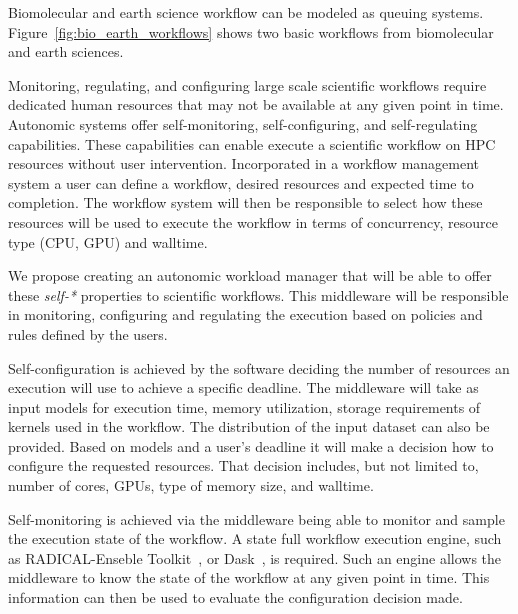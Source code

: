 Biomolecular and earth science workflow can be modeled as queuing systems. Figure~\ref{fig:bio_earth_workflows} shows two basic workflows from biomolecular and earth sciences.




Monitoring, regulating, and configuring large scale scientific workflows 
require dedicated human resources that may not be available at any given point 
in time. Autonomic systems offer self-monitoring, self-configuring, and 
self-regulating capabilities. These capabilities can enable execute a 
scientific workflow on HPC resources without user intervention. Incorporated in 
a workflow management system a user can define a workflow, desired resources 
and expected time to completion. The workflow system will then be responsible 
to select how these resources will be used to execute the workflow in terms of 
concurrency, resource type (CPU, GPU) and walltime.

We propose creating an autonomic workload manager that will be able to offer 
these \textit{self-*} properties to scientific workflows. This middleware will 
be responsible in monitoring, configuring and regulating the execution based on 
policies and rules defined by the users.

Self-configuration is achieved by the software deciding the number of resources 
an execution will use to achieve a specific deadline. The middleware will take 
as input models for execution time, memory utilization, storage requirements of 
kernels used in the workflow. The distribution of the input dataset can also be 
provided. Based on models and a user's deadline it will make a decision how to 
configure the requested resources. That decision includes, but not limited to, 
number of cores, GPUs, type of memory size, and walltime.

Self-monitoring is achieved via the middleware being able to monitor and sample 
the execution state of the workflow. A state full workflow execution engine,
such as RADICAL-Enseble Toolkit~\cite{balasubramanian2018harnessing}, or 
Dask~\cite{rocklin2015dask}, is required. Such an engine allows the middleware 
to know the state of the workflow at any given point in time. This information 
can then be used to evaluate the configuration decision made.

